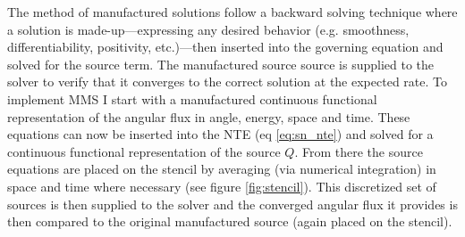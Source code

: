 The method of manufactured solutions follow a backward solving technique where a solution is made-up---expressing any desired behavior (e.g. smoothness, differentiability, positivity, etc.)---then inserted into the governing equation and solved for the source term.
The manufactured source source is supplied to the solver to verify that it converges to the correct solution at the expected rate. 
To implement MMS I start with a manufactured continuous functional representation of the angular flux in angle, energy, space and time.
These equations can now be inserted into the NTE (eq \ref{eq:sn_nte}) and solved for a continuous functional representation of the source $Q$.
From there the source equations are placed on the stencil by averaging (via numerical integration) in space and time where necessary (see figure \ref{fig:stencil}).
This discretized set of sources is then supplied to the solver and the converged angular flux it provides is then compared to the original manufactured source (again placed on the stencil).
